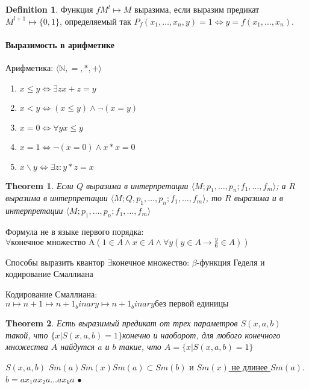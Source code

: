 \documentclass[a4paper]{article}
\theoremstyle{plain}
\newtheorem{theorem}{Theorem}
\theoremstyle{remark}
\theoremstyle{definition}
\newtheorem{definition}{Definition}
\renewenvironment{proof}{{\bfseries Proof}}{$\bullet$}
\newcommand{\bra}[1]{\langle #1 \rangle}
\begin{document}
\begin{definition}
	Функция $f M^l \mapsto M$ выразима, если выразим предикат $M^{l + 1} \mapsto \{0,1\}$, определяемый так $P_f(x_1, \ldots, x_n, y) = 1 \Leftrightarrow y = f(x_1, \ldots, x_n)$. 
\end{definition}

\paragraph{Выразимость в арифметике}
Арифметика: $\bra{\mathbb{N}, =, *, +}$
\begin{enumerate}
	\item $x \leq y \Leftrightarrow \exists{z} x + z = y$ 
	\item $x < y \Leftrightarrow (x \leq y) \land \lnot (x = y)$
	\item $x = 0 \Leftrightarrow \forall{y} x \leq y$
	\item $x = 1 \Leftrightarrow \lnot(x = 0) \land x * x = 0$
	\item $x \backslash y \Leftrightarrow \exists{z}: y * z = x$
\end{enumerate}

\begin{theorem}
	Если $Q$ выразима в интерпретации $\bra{M; p_1, \ldots, p_n; f_1, \ldots, f_m}$; а $R$ выразима в интерпретации $\bra{M; Q, p_1, \ldots, p_n; f_1, \ldots, f_m}$, то $R$ выразима и в интерпретации $\bra{M; p_1, \ldots, p_n; f_1, \ldots, f_m}$
\end{theorem}

Формула не в языке первого порядка: $\forall{\text{конечное множество A}}(1 \in A \land x \in A \land \forall{y}(y \in A \rightarrow \frac{y}{6} \in A))$

Способы выразить квантор $\exists{\text{конечное множество}}$: $\beta$-функция Геделя и кодирование Смаллиана

Кодирование Смаллиана: $n \mapsto n + 1 \mapsto {n + 1}_binary \mapsto {n + 1}_binary \text{без первой единицы}$

\begin{theorem}
	Есть выразимый предикат от трех параметров $S(x,a,b)$ такой, что $\{x|S(x,a,b) = 1\}$конечно и наоборот, для любого конечного множества $A$ найдутся $a$ и $b$ такие, что $A=\{x|S(x,a,b) = 1\}$
\end{theorem}

\begin{proof}
	$S(x,a,b)$ $Sm(a)Sm(x)Sm(a)\subset Sm(b)$ и \underline{$Sm(x)$ не длинее $Sm(a)$}. \newline
	$b = ax_1ax_2a\ldots ax_ka$	
\end{proof}
\end{document}
